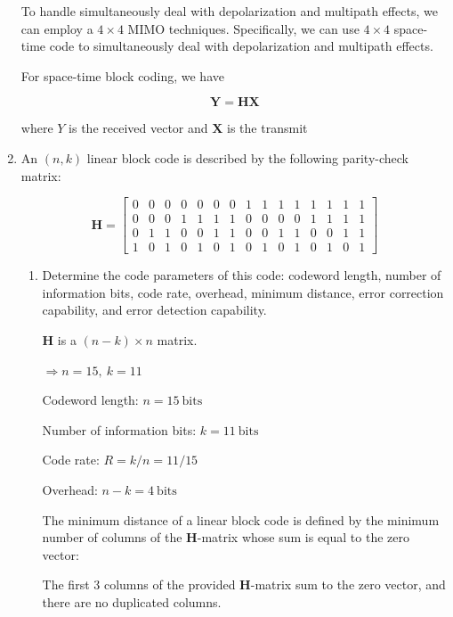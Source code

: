 \documentclass[fleqn]{article}
\makeatletter
\newenvironment{equationCenter}{\@fleqnfalse\begin{equation*}}{\end{equation*}}
\makeatother
\begin{document}
\begin{enumerate}
		To handle simultaneously deal with depolarization and multipath effects, we can employ a $4 \times 4$ MIMO techniques. Specifically, we can use $4 \times 4$ space-time code to simultaneously deal with depolarization and multipath effects.
		
		For space-time block coding, we have
		
		\begin{equation*}
			\mathbf{Y} = \mathbf{HX}
		\end{equation*}
			
		where $Y$ is the received vector and $\mathbf{X}$ is the transmit 
		
		\item An $(n,k)$ linear block code is described by the following parity-check matrix:
		
		\begin{equationCenter}
			\mathbf{H} = \begin{bmatrix}
				0 & 0 & 0 & 0 & 0 & 0 & 0 & 1 & 1 & 1 & 1 & 1 & 1 & 1 & 1 \\
				0 & 0 & 0 & 1 & 1 & 1 & 1 & 0 & 0 & 0 & 0 & 1 & 1 & 1 & 1 \\
				0 & 1 & 1 & 0 & 0 & 1 & 1 & 0 & 0 & 1 & 1 & 0 & 0 & 1 & 1 \\
				1 & 0 & 1 & 0 & 1 & 0 & 1 & 0 & 1 & 0 & 1 & 0 & 1 & 0 & 1
			\end{bmatrix}
		\end{equationCenter}
		
		\begin{enumerate}
			\item Determine the code parameters of this code: codeword length, number of information bits, code rate, overhead, minimum distance, error correction capability, and error detection capability.
			
			$\mathbf{H}$ is a $(n-k) \times n$ matrix.

			$\Rightarrow n = 15,\ k = 11$
						
			Codeword length: $n = 15\ \text{bits}$
			
			Number of information bits: $k = 11\ \text{bits}$
			
			Code rate: $R = k/n = 11/15$
			
			Overhead: $n - k = 4\ \text{bits}$
			
			The minimum distance of a linear block code is defined by the minimum number of columns of the $\mathbf{H}$-matrix whose sum is equal to the zero vector:
			
			The first 3 columns of the provided $\mathbf{H}$-matrix sum to the zero vector, and there are no duplicated columns.
			

\end{enumerate}
\end{enumerate}
\end{document}
